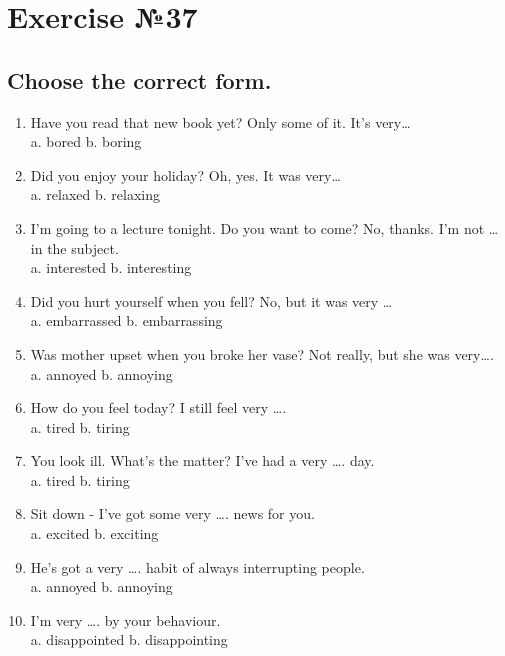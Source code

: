 \section*{Exercise №37}
\subsection*{Choose the correct form.}
\begin{enumerate}
      \item {} Have you read that new book yet?  Only some of it. It’s very…\\
            a. bored \quad b. boring

      \item {} Did you enjoy your holiday?  Oh, yes. It was very…\\
            a. relaxed \quad b. relaxing

      \item {} I'm going to a lecture tonight. Do you want to come?  No, thanks. I'm not … in the subject.\\
            a. interested \quad b. interesting

      \item {} Did you hurt yourself when you fell?  No, but it was very …\\
            a. embarrassed \quad b. embarrassing

      \item {} Was mother upset when you broke her vase?  Not really, but she was very….\\
            a. annoyed \quad b. annoying

      \item {} How do you feel today?  I still feel very ….\\
            a. tired \quad b. tiring

      \item {} You look ill. What’s the matter?  I’ve had a very …. day.\\
            a. tired \quad b. tiring

      \item Sit down - I've got some very …. news for you.\\
            a. excited \quad b. exciting

      \item He's got a very …. habit of always interrupting people.\\
            a. annoyed \quad b. annoying

      \item I'm very …. by your behaviour.\\
            a. disappointed \quad b. disappointing
\end{enumerate}


